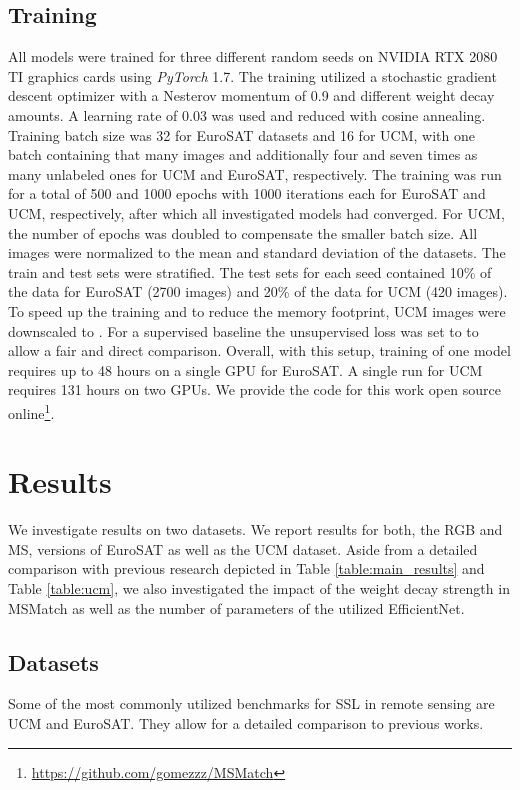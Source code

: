 \documentclass[journal]{IEEEtran}
\begin{document}
\subsection{Training}
All models were trained for three different random seeds on NVIDIA RTX 2080 TI graphics cards using \textit{PyTorch} 1.7. The training utilized a stochastic gradient descent optimizer with a Nesterov momentum of 0.9 and different weight decay amounts. A learning rate of 0.03 was used and reduced with cosine annealing. Training batch size was 32 for EuroSAT datasets and 16 for UCM, with one batch containing that many images and additionally four and seven times as many unlabeled ones for UCM and EuroSAT, respectively. The training was run for a total of 500 and 1000 epochs with 1000 iterations each for EuroSAT and UCM, respectively, after which all investigated models had converged. For UCM, the number of epochs was doubled to compensate the smaller batch size.
All images were normalized to the mean and standard deviation of the datasets. The train and test sets were stratified. The test sets for each seed contained 10\% of the data for EuroSAT (2700 images) and 20\% of the data for UCM (420 images). To speed up the training and to reduce the memory footprint, UCM images were downscaled to .
For a supervised baseline the unsupervised loss  was set to  to allow a fair and direct comparison. Overall, with this setup, training of one model requires up to 48 hours on a single GPU for EuroSAT. A single run for UCM requires 131 hours on two GPUs. We provide the code for this work open source online\footnote{\url{https://github.com/gomezzz/MSMatch}}.


\section{Results}
We investigate results on two datasets. We report results for both, the RGB and MS, versions of EuroSAT as well as the UCM dataset. Aside from a detailed comparison with previous research depicted in Table \ref{table:main_results} and Table \ref{table:ucm}, we also investigated the impact of the weight decay strength in MSMatch as well as the number of parameters of the utilized EfficientNet. \\

\subsection{Datasets}
Some of the most commonly utilized benchmarks for SSL in remote sensing are UCM and EuroSAT. They allow for a detailed comparison to previous works.
\end{document}
